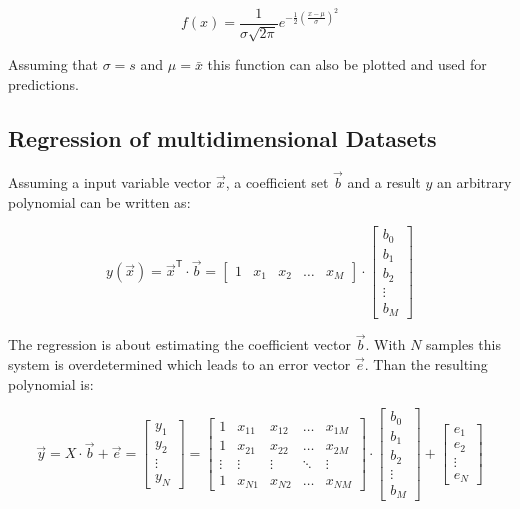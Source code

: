 \begin{equation}
f\left( x \right) = \frac{1}{\sigma\sqrt{2\pi}}e^{-\frac{1}{2}\left(\frac{x-\mu}{\sigma}\right)^2}
\end{equation}

Assuming that $\sigma = s$ and $\mu = \bar{x}$ this function can also be plotted and used for predictions.

\subsection{Regression of multidimensional Datasets}
\label{sec:regod} 
Assuming a input variable vector $\vec{x}$, a coefficient set $\vec{b}$ and a result $y$ an arbitrary polynomial can be written as: \cite{sip}

\begin{equation}
y\left(\vec{x}\right) = \vec{x}^{\mathsf T}\cdot\vec{b}=\begin{bmatrix}
1 & x_1 & x_2 & \dots & x_M
\end{bmatrix} \cdot \begin{bmatrix}
b_0 \\ b_1 \\ b_2 \\ \vdots \\ b_M
\end{bmatrix}
\end{equation}

The regression is about estimating the coefficient vector $\vec{b}$. With $N$ samples this system is overdetermined which leads to an error vector $\vec{e}$. Than the resulting polynomial is:

\begin{equation}
\vec{y}=X\cdot \vec{b}+\vec{e}=\begin{bmatrix}
y_1 \\ y_2 \\ \vdots \\ y_N
\end{bmatrix} = \begin{bmatrix}
1 & x_{11} & x_{12} & \dots & x_{1M} \\
1 & x_{21} & x_{22} & \dots & x_{2M} \\
\vdots & \vdots & \vdots & \ddots & \vdots \\
1 & x_{N1} & x_{N2} & \dots & x_{NM}
\end{bmatrix} \cdot \begin{bmatrix}
b_0 \\ b_1 \\ b_2 \\ \vdots \\ b_M
\end{bmatrix} + \begin{bmatrix}
e_1 \\ e_2 \\ \vdots \\ e_N
\end{bmatrix}
\end{equation}

